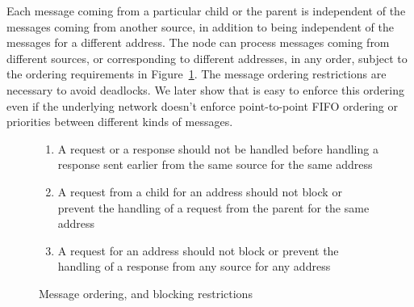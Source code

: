 Each message coming from a particular child or the parent is independent of the
messages coming from another source, in addition to being independent of the
messages for a different address. The node can process messages coming from
different sources, or corresponding to different addresses, in any order,
subject to the ordering requirements in Figure~\ref{list:messageOrder}. The
message ordering restrictions are necessary to avoid deadlocks. We later show
that is easy to enforce this ordering even if the underlying network doesn't
enforce point-to-point FIFO ordering or priorities between different kinds of
messages.


\begin{figure}
\begin{minipage}{\columnwidth}
\begin{enumerate}
\item A request or a response should not be handled before handling a response
sent earlier from the same source for the same address

\item A request from a child for an address should not block or prevent the
handling of a request from the parent for the same address

\item A request for an address should not block or prevent the handling of a
response from any source for any address
\end{enumerate}
\end{minipage}
\caption{Message ordering, and blocking restrictions}
\label{list:messageOrder}
\end{figure}



